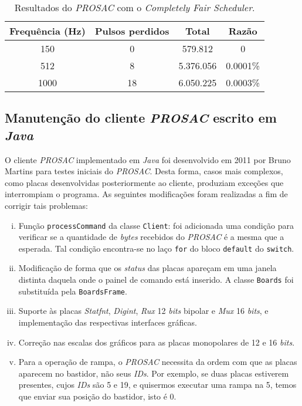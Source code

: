 \begin{table}[h]

	\centering
	\caption{\label{tab:prosac} Resultados do \textit{PROSAC} com o
	\textit{Completely Fair Scheduler}.}
	\begin{tabular}{| c | c | c | c |}
		\hline
		\textbf{Frequência (Hz)} & \textbf{Pulsos perdidos} & \textbf{Total} &
		\textbf{Razão} \\ \hline 
		150 & 0 & 579.812  & 0 \\ \hline
		512 & 8 & 5.376.056 & 0.0001\% \\ \hline
		1000 & 18 & 6.050.225 & 0.0003\% \\ \hline
	\end{tabular}	    
\end{table}
 
 
\subsection {Manutenção do cliente \textit{PROSAC} escrito em \textit{Java}}

O cliente \textit{PROSAC} implementado em \textit{Java} foi desenvolvido em 2011
por Bruno Martins para testes iniciais do \textit{PROSAC}. Desta forma, casos mais
complexos, como placas desenvolvidas posteriormente ao cliente, produziam
exceções que interrompiam o programa. As seguintes modificações foram realizadas
a fim de corrigir tais problemas:

\begin {enumerate} [i.] 
  \item Função \texttt{processCommand} da classe \texttt{Client}: foi adicionada
  uma condição para verificar se a quantidade de \textit{bytes} recebidos do
  \textit{PROSAC} é a mesma que a esperada. Tal condição encontra-se no laço
  \texttt{for} do bloco \texttt{default} do \texttt{switch}.

  \item Modificação de forma que os \textit{status} das placas apareçam em uma
  janela distinta daquela onde o painel de comando está inserido. A classe
  \texttt{Boards} foi substituída pela \texttt{BoardsFrame}.
  
  \item Suporte às placas \textit{Statfnt}, \textit{Digint}, \textit{Rux} 12
  \textit{bits} bipolar e \textit{Mux} 16 \textit{bits}, e implementação das
  respectivas interfaces gráficas.

  \item Correção nas escalas dos gráficos para as placas monopolares de 12 e 16
  \textit{bits}.
  
  \item Para a operação de rampa, o \textit{PROSAC} necessita da ordem com que
  as placas aparecem no bastidor, não seus \textit{IDs}. Por exemplo, se duas
  placas estiverem presentes, cujos \textit{IDs} são 5 e 19, e quisermos
  executar uma rampa na 5, temos que enviar sua posição do bastidor, isto é 0.

\end{enumerate}

